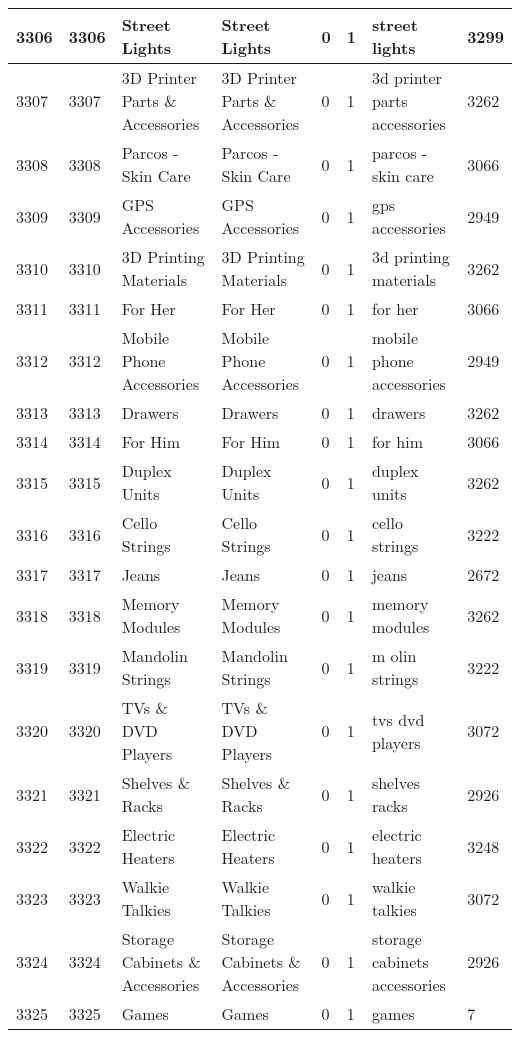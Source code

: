 \begin{longtable}{|l|l|l|l|l|l|l|l|}
3306 & 3306 & Street Lights & Street Lights & 0 & 1 & street lights & 3299 \\ \hline 
3307 & 3307 & 3D Printer Parts \& Accessories & 3D Printer Parts \& Accessories & 0 & 1 & 3d printer parts accessories & 3262 \\ \hline 
3308 & 3308 & Parcos - Skin Care & Parcos - Skin Care & 0 & 1 & parcos - skin care & 3066 \\ \hline 
3309 & 3309 & GPS Accessories & GPS Accessories & 0 & 1 & gps accessories & 2949 \\ \hline 
3310 & 3310 & 3D Printing Materials & 3D Printing Materials & 0 & 1 & 3d printing materials & 3262 \\ \hline 
3311 & 3311 & For Her & For Her & 0 & 1 & for her & 3066 \\ \hline 
3312 & 3312 & Mobile Phone Accessories & Mobile Phone Accessories & 0 & 1 & mobile phone accessories & 2949 \\ \hline 
3313 & 3313 & Drawers & Drawers & 0 & 1 & drawers & 3262 \\ \hline 
3314 & 3314 & For Him & For Him & 0 & 1 & for him & 3066 \\ \hline 
3315 & 3315 & Duplex Units & Duplex Units & 0 & 1 & duplex units & 3262 \\ \hline 
3316 & 3316 & Cello Strings & Cello Strings & 0 & 1 & cello strings & 3222 \\ \hline 
3317 & 3317 & Jeans & Jeans & 0 & 1 & jeans & 2672 \\ \hline 
3318 & 3318 & Memory Modules & Memory Modules & 0 & 1 & memory modules & 3262 \\ \hline 
3319 & 3319 & Mandolin Strings & Mandolin Strings & 0 & 1 & m olin strings & 3222 \\ \hline 
3320 & 3320 & TVs \& DVD Players & TVs \& DVD Players & 0 & 1 & tvs dvd players & 3072 \\ \hline 
3321 & 3321 & Shelves \& Racks & Shelves \& Racks & 0 & 1 & shelves racks & 2926 \\ \hline 
3322 & 3322 & Electric Heaters & Electric Heaters & 0 & 1 & electric heaters & 3248 \\ \hline 
3323 & 3323 & Walkie Talkies & Walkie Talkies & 0 & 1 & walkie talkies & 3072 \\ \hline 
3324 & 3324 & Storage Cabinets \& Accessories & Storage Cabinets \& Accessories & 0 & 1 & storage cabinets accessories & 2926 \\ \hline 
3325 & 3325 & Games & Games & 0 & 1 & games & 7 \\ \hline 

\end{longtable}
